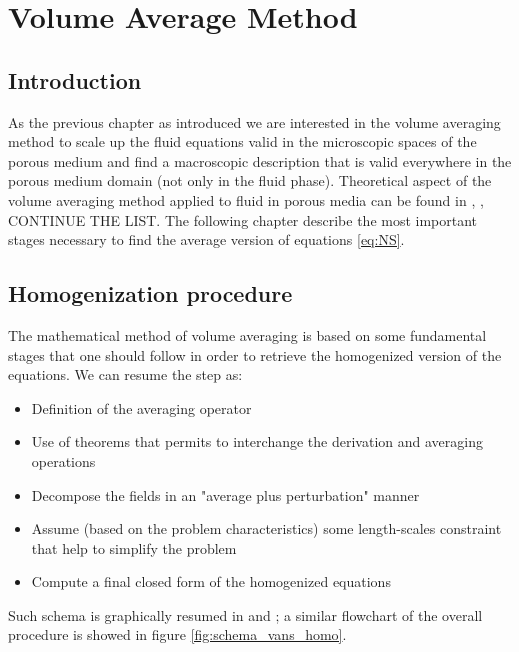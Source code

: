 \chapter{Volume Average Method}
\label{ch:vans}


\section{Introduction}

As the previous chapter as introduced we are interested in the volume averaging method to scale up the fluid equations valid in the microscopic spaces of the porous medium and find a macroscopic description that is valid everywhere in the porous medium domain (not only in the fluid phase).
Theoretical aspect of the volume averaging method applied to fluid in porous media can be found in \citet{whitaker2013method}, \citet{whitaker1986flow}, \citet{whitaker1996forchheimer} CONTINUE THE LIST.
The following chapter describe the most important stages necessary to find the average version of equations \eqref{eq:NS}.

\section{Homogenization procedure}
The mathematical method of volume averaging is based on some fundamental stages that one should follow in order to retrieve the homogenized version of the equations.
We can resume the step as:
\begin{itemize}
\item Definition of the averaging operator
\item Use of theorems that permits to interchange the derivation and averaging operations
\item Decompose the fields in an "average plus perturbation" manner
\item Assume (based on the problem characteristics) some length-scales constraint that help to simplify the problem
\item Compute a final closed form of the homogenized equations
\end{itemize}

Such schema is graphically resumed in \citet{paez2017macroscopic} and \citet{davit2013homogenization}; a similar flowchart of the overall procedure is showed in figure \ref{fig:schema_vans_homo}.

